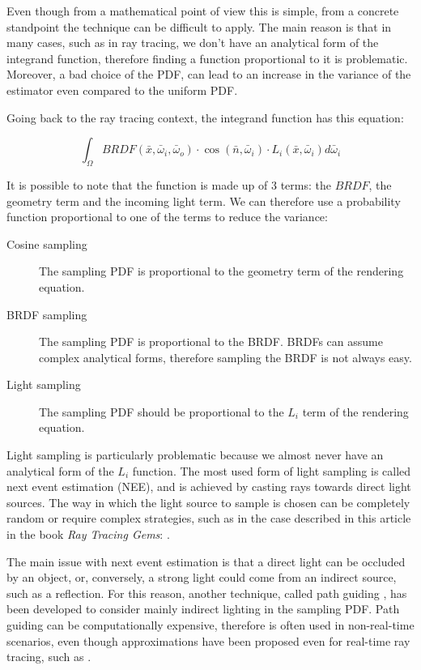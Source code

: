 \documentclass{PoliMi_MasterThesis}
\begin{document}
Even though from a mathematical point of view this is simple, from a concrete standpoint the technique can be difficult to apply. The main reason is that in many cases, such as in ray tracing, we don't have an analytical form of the integrand function, therefore finding a function proportional to it is problematic. Moreover, a bad choice of the PDF, can lead to an increase in the variance of the estimator even compared to the uniform PDF.

Going back to the ray tracing context, the integrand function has this equation:

$$\int_\Omega BRDF(\bar{x}, \bar{\omega}_i, \bar{\omega}_o) \cdot \cos(\bar{n}, \bar{\omega}_i) \cdot L_i(\bar{x}, \bar{\omega}_i) d\bar{\omega}_i$$

It is possible to note that the function is made up of 3 terms: the $BRDF$, the geometry term and the incoming light term. We can therefore use a probability function proportional to one of the terms to reduce the variance:
\begin{description}
	\item[Cosine sampling] The sampling PDF is proportional to the geometry term of the rendering equation.
	\item[BRDF sampling] The sampling PDF is proportional to the BRDF. BRDFs can assume complex analytical forms, therefore sampling the BRDF is not always easy.
	\item[Light sampling] The sampling PDF should be proportional to the $L_i$ term of the rendering equation.
\end{description}

Light sampling is particularly problematic because we almost never have an analytical form of the $L_i$ function. The most used form of light sampling is called next event estimation (NEE), and is achieved by casting rays towards direct light sources. The way in which the light source to sample is chosen can be completely random or require complex strategies, such as in the case described in this article in the book \textit{Ray Tracing Gems}: \cite{multi_light_sampling}.

The main issue with next event estimation is that a direct light can be occluded by an object, or, conversely, a strong light could come from an indirect source, such as a reflection. For this reason, another technique, called path guiding \cite{path_guiding}, has been developed to consider mainly indirect lighting in the sampling PDF. Path guiding can be computationally expensive, therefore is often used in non-real-time scenarios, even though approximations have been proposed even for real-time ray tracing, such as \cite{real_time_path_guiding}.
\end{document}
